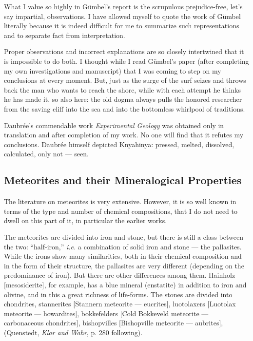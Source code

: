 \documentclass[a4paper, 12pt, oneside]{article}
\begin{document}
What I value so highly in Gümbel's report is the scrupulous prejudice-free, let's say impartial, observations. I have allowed myself to quote the work of Gümbel literally because it is indeed difficult for me to summarize such representations and to separate fact from interpretation.

Proper observations and incorrect explanations are so closely intertwined that it is impossible to do both. I thought while I read Gümbel's paper (after completing my own investigations and manuscript) that I was coming to step on my conclusions at every moment. But, just as the surge of the surf seizes and throws back the man who wants to reach the shore, while with each attempt he thinks he has made it, so also here: the old dogma always pulls the honored researcher from the saving cliff into the sea and into the bottomless whirlpool of traditions.

Daubrée's commendable work \emph{Experimental Geology} was obtained only in translation and after completion of my work. No one will find that it refutes my conclusions. Daubrée himself depicted Knyahinya: pressed, melted, dissolved, calculated, only not --- seen.
\clearpage
\subsection{Meteorites and their Mineralogical Properties}
\paragraph*{}
The literature on meteorites is very extensive. However, it is so well known in terms of the type and number of chemical compositions, that I do not need to dwell on this part of it, in particular the earlier works.

The meteorites are divided into iron and stone, but there is still a class between the two: ``half-iron,'' \emph{i.e.} a combination of solid iron and stone --- the pallasites. While the irons show many similarities, both in their chemical composition and in the form of their structure, the pallasites are very different (depending on the predominance of iron). But there are other differences among them. Hainholz [mesosiderite], for example, has a blue mineral (enstatite) in addition to iron and olivine, and in this a great richness of life-forms. The stones are divided into chondrites, stannerites [Stannern meteorite --- eucrites], luotolaxers [Luotolax meteorite --- howardites], bokkefelders [Cold Bokkeveld meteorite --- carbonaceous chondrites], bishopvilles [Bishopville meteorite --- aubrites], (Quenstedt, \emph{Klar and Wahr}, p. 280 following).
\end{document}
